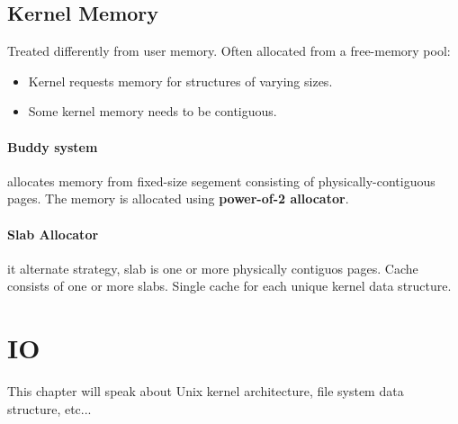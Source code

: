 \documentclass[12pt]{article}
\begin{document}
\subsection{Kernel Memory}
Treated differently from user memory. Often allocated from a free-memory pool:
\begin{itemize}
  \item Kernel requests memory for structures of varying sizes.
  \item Some kernel memory needs to be contiguous.
\end{itemize}
\paragraph{Buddy system} allocates memory from fixed-size segement consisting of physically-contiguous pages. The memory is allocated using \textbf{power-of-2 allocator}.
\paragraph{Slab Allocator} it alternate strategy, slab is one or more physically contiguos pages. Cache consists of one or more slabs. Single cache for each unique kernel data structure.
\section{I\/O}
This chapter will speak about Unix kernel architecture, file system data structure, etc...
\end{document}
